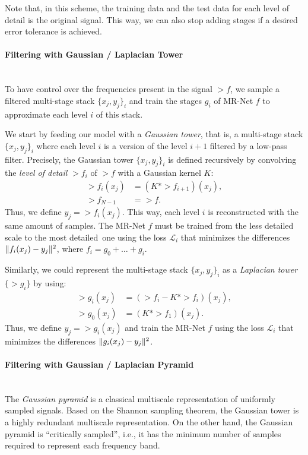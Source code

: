 Note that, in this scheme, the training data and the test data for each level of detail is the original signal. This way, we can also stop adding stages if a desired error tolerance is achieved.


\paragraph{Filtering with Gaussian / Laplacian Tower}~\\
To have control over the frequencies present in the signal $\gt{f}$, we sample a filtered multi-stage stack $\{x_j, y_j\}_i$ and train the stages $g_i$ of MR-Net $f$ to approximate each level $i$ of this stack.

We start by feeding our model with a \textit{Gaussian tower}, that is, a multi-stage stack $\{x_j, y_j\}_i$ where each level $i$ is a version of the level $i+1$ filtered by a low-pass filter. 
Precisely, the Gaussian tower $\{x_j, y_j\}_i$ is defined recursively by convolving the \textit{level of detail} $\gt{f}_i$ of $\gt{f}$ with a Gaussian kernel $K$:
\begin{align*}
    \gt{f}_i(x_j)&=\left(K*\gt{f}_{i+1}\right)(x_j),\\
    \gt{f}_{N-1}&=\gt{f}.
\end{align*}
Thus, we define $y_j=\gt{f}_i(x_j)$.
This way, each level $i$ is reconstructed with the same amount of samples. The MR-Net $f$ must be trained from the less detailed scale to the most detailed~one using the loss $\mathcal{L}_i$ that minimizes the differences $\lVert f_i(x_j)-y_j\rVert^2$, where $f_i=g_0+\dots+g_{i}$.

Similarly, we could represent the multi-stage stack $\{x_j, y_j\}_i$ as a \textit{Laplacian tower} $\{\gt{g}_i\}$ by using:
\begin{align*}
    \gt{g}_i(x_j)&=\left(\gt{f}_{i}-K*\gt{f}_{i}\right)(x_j),\\
    \gt{g}_0(x_j)&=\left(K*\gt{f}_{1}\right)(x_j).
\end{align*}
Thus, we define $y_j=\gt{g}_i(x_j)$ and train the MR-Net $f$ using the loss $\mathcal{L}_i$ that minimizes the differences $\lVert g_i(x_j)-y_j\rVert^2$.


\paragraph{Filtering with Gaussian / Laplacian Pyramid}~\\
The \textit{Gaussian pyramid} is a classical multiscale representation of uniformly sampled signals. Based on the Shannon sampling theorem, the Gaussian tower is a highly redundant multiscale representation. On the other hand, the Gaussian pyramid is ``critically sampled'', i.e., it has the minimum number of samples required to represent each frequency band. 

